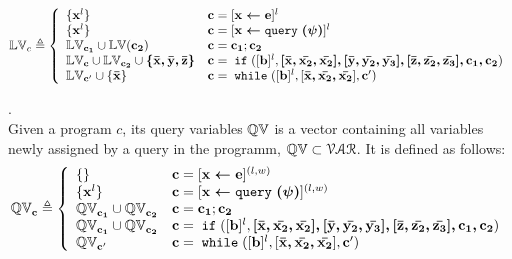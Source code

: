 \begin{defn}
$$
  \lvar_{c} \triangleq
  \left\{
  \begin{array}{ll}
      \{\ssa{x}^l\}                   
      & \ssa{c} = [\ssa{\assign x e}]^{l} 
      \\
      \{\ssa{x}^l\}                   
      & \ssa{c} = [\ssa{\assign x \query(\qexpr)}]^{l} 
      \\
      \lvar_{\ssa{c_1}} \cup \lvar{(\ssa{c_2})}  
      & \ssa{c} = \ssa{c_1};\ssa{c_2}
      \\
      \lvar_{\ssa{c}} \cup \lvar_{\ssa{c_2}} \cup \ssa{\{\bar{x}, \bar{y}, \bar{z}\}} 
      & \ssa{c} =\eif([\sbexpr]^{l} , \ssa{[\bar{x}, \bar{x_2}, \bar{x_2}], 
      [\bar{y}, \bar{y_2}, \bar{y_3}], 
      [\bar{z}, \bar{z_2}, \bar{z_3}], c_1, c_2}) 
      \\
      \lvar_{\ssa{c}'} \cup \{\ssa{\bar{x}}\}
      & \ssa{c}   = \ewhile ([\sbexpr]^{l}, [\ssa{\bar{x}, \bar{x_2}, \bar{x_2}}], \ssa{c}')
\end{array}
\right.
$$
\end{defn}
%
\begin{defn}.
\\
Given a program $c$, its query variables $\mathbb{QV}$ is a vector containing all variables newly assigned by a query in the programm, $\mathbb{QV} \subset \mathcal{VAR}$.
It is defined as follows:
$$
  \qvar_{\ssa{c}} \triangleq
  \left\{
  \begin{array}{ll}
      \{\}                  
      & \ssa{c} = [\ssa{\assign x e}]^{(l, w)} 
      \\
      \{\ssa{x}^l\}                  
      & \ssa{c} = [\ssa{\assign x \query(\qexpr)}]^{(l, w)} 
      \\
      \qvar_{\ssa{c_1}} \cup \qvar_{\ssa{c_2}}  
      & \ssa{c} = \ssa{c_1};\ssa{c_2}
      \\
      \qvar_{\ssa{c_1}} \cup \qvar_{\ssa{c_2}} 
      & \ssa{c} =\eif([\sbexpr]^{l} , \ssa{[\bar{x}, \bar{x_2}, \bar{x_2}], 
      [\bar{y}, \bar{y_2}, \bar{y_3}], 
      [\bar{z}, \bar{z_2}, \bar{z_3}], c_1, c_2}) 
      \\
      \qvar_{\ssa{c}'}
      & \ssa{c}   = \ewhile ([\sbexpr]^{l}, [\ssa{\bar{x}, \bar{x_2}, \bar{x_2}}], \ssa{c}')
\end{array}
\right.
$$
\end{defn}

